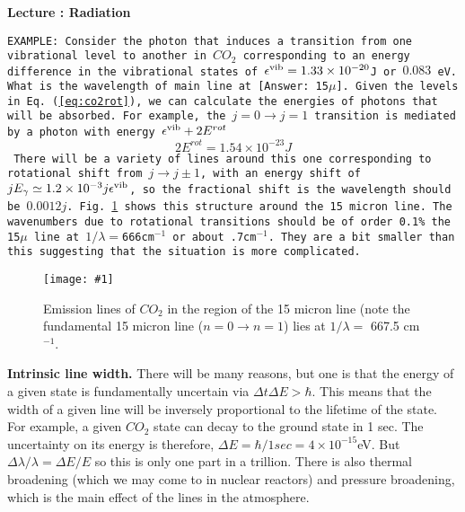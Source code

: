 \documentclass[11pt]{book}
\def\be{\begin{equation}}
\def\ee{\end{equation}}
\newcommand{\ec}[1]{Eq.~(\ref{eq:#1})}
\newcommand{\sfig}[2]{
\texttt{[image: \#1]}
        }
\newcommand{\Spng}[2]{
   \begin{figure}[thbp]
   \begin{center}
    \sfig{../Figures/#1.png}{0.7\columnwidth}
    \caption{{\small #2}}
    \label{fig:#1}
     \end{center}
   \end{figure}
}
\newcommand{\rf}[1]{\ref{fig:#1}}
\newcommand\example[1]{{\tt EXAMPLE: #1}}
\newcommand\lecture[1]{\newpage
\addtocounter{lectureno}{1}
\setcounter{secno}{0}
\begin{center}
 {\bf Lecture \arabic{lectureno}: #1}
\end{center}
}
\newcounter{lectureno}
\newcounter{secno}
\begin{document}
\lecture{Radiation}
\example{Consider the photon that induces a transition from one vibrational level to another in $CO_2$ corresponding to an energy difference in the vibrational states of $\epsilon^{\rm vib}=1.33\times 10^{-20}$J or $0.083$ eV. What is the wavelength of main line at [Answer: 15$\mu$]. 
Given the levels in \ec{co2rot}, we can calculate the energies of photons that will be absorbed. For example, the $j=0\rightarrow j=1$ transition is mediated by a photon with energy $\epsilon^{\rm vib}+2E^{rot}$
\be
2E^{rot}= 1.54\times 10^{-23} J\ee
There will be a variety of lines around this one corresponding to rotational shift from $j\rightarrow j\pm1$, with an energy shift of $jE_\gamma\simeq 1.2\times10^{-3} j \epsilon^{\rm vib}$, so the fractional shift is the wavelength should be $0.0012j$. Fig.~\rf{CO2-lines-detail} shows this structure around the 15 micron line. 
The wavenumbers due to rotational transitions should be of order 0.1\% the 15$\mu$ line at $1/\lambda=$666cm$^{-1}$ or about .7cm$^{-1}$. They are a bit smaller than this suggesting that the situation is more complicated. 
\Spng{CO2-lines-detail}{Emission lines of $CO_2$ in the region of the 15 micron line (note the fundamental 15 micron line ($n=0\rightarrow n=1$) lies at $1/\lambda=$ 667.5 cm$^{-1}$.}
}

{\bf Intrinsic line width.} There will be many reasons, but one is that the energy of a given state is fundamentally uncertain via $\Delta t\Delta E >\hbar$. This means that the width of a given line will be inversely proportional to the lifetime of the state. For example, a given $CO_2$ state can decay to the ground state in 1 sec. The uncertainty on its energy is therefore, $\Delta E = \hbar/1sec = 4\times 10^{-15}$eV. But $\Delta\lambda/\lambda = \Delta E/E$ so this is only one part in a trillion. There is also thermal broadening (which we may come to in nuclear reactors) and pressure broadening, which is the main effect of the lines in the atmosphere.
\end{document}
